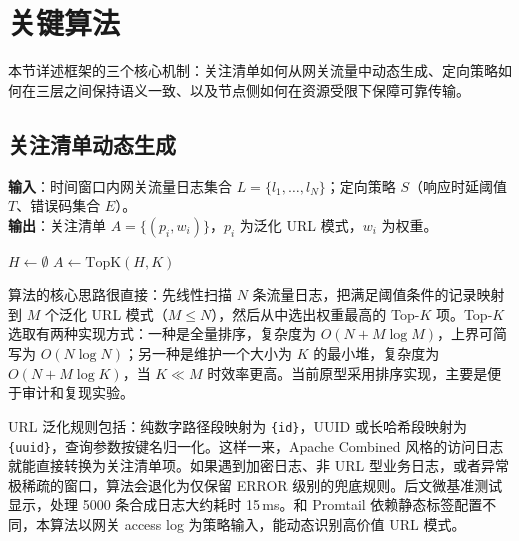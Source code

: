\section{关键算法}

本节详述框架的三个核心机制：关注清单如何从网关流量中动态生成、定向策略如何在三层之间保持语义一致、以及节点侧如何在资源受限下保障可靠传输。

\subsection{关注清单动态生成}
\textbf{输入}：时间窗口内网关流量日志集合 $L=\{l_1,\ldots,l_N\}$；定向策略 $S$（响应时延阈值 $T$、错误码集合 $E$）。\\
\textbf{输出}：关注清单 $A=\{(p_i,w_i)\}$，$p_i$ 为泛化 URL 模式，$w_i$ 为权重。

\begin{algorithm}[htbp]
\caption{关注清单动态生成}\label{alg:attention}
$H \leftarrow \emptyset$\;
$A \leftarrow \mathrm{TopK}(H, K)$ 
\;
\end{algorithm}

算法的核心思路很直接：先线性扫描 $N$ 条流量日志，把满足阈值条件的记录映射到 $M$ 个泛化 URL 模式（$M\leq N$），然后从中选出权重最高的 Top-$K$ 项。Top-$K$ 选取有两种实现方式：一种是全量排序，复杂度为 $O(N+M\log M)$，上界可简写为 $O(N\log N)$；另一种是维护一个大小为 $K$ 的最小堆，复杂度为 $O(N+M\log K)$，当 $K \ll M$ 时效率更高。当前原型采用排序实现，主要是便于审计和复现实验。

URL 泛化规则包括：纯数字路径段映射为 \texttt{\{id\}}，UUID 或长哈希段映射为 \texttt{\{uuid\}}，查询参数按键名归一化。这样一来，Apache Combined 风格的访问日志就能直接转换为关注清单项。如果遇到加密日志、非 URL 型业务日志，或者异常极稀疏的窗口，算法会退化为仅保留 ERROR 级别的兜底规则。后文微基准测试显示，处理 5000 条合成日志大约耗时 15\,ms。和 Promtail 依赖静态标签配置不同，本算法以网关 access log 为策略输入，能动态识别高价值 URL 模式。


